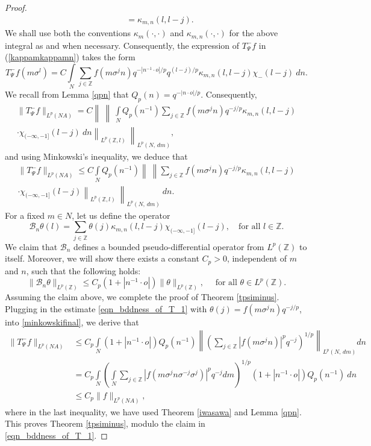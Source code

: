 \documentclass[12pt,reqno]{amsart}
\newcommand{\Z}{\mathbb Z}%
\theoremstyle{definition}
\theoremstyle{definition}
\numberwithin{equation}{section}
\begin{document}
\begin{proof}
\begin{equation}
\begin{aligned}
&=\kappa_{m,n}(l,l-j).
\end{aligned}
\end{equation}
We shall use both the conventions $\kappa_{m}(\cdot,\cdot)$ and $\kappa_{m,n}(\cdot,\cdot)$ for the above integral as and when necessary. Consequently, the expression of $T_{\Psi}^{-}f$ in (\ref{kappamkappamn}) takes the form
	$$T_{\Psi}^{-}f(m\sigma^{l})=C\int\limits_{N}\sum\limits_{j\in\mathbb{Z}}f(m\sigma^{j}n)q^{-|n^{-1}\cdot o|/p}q^{(l-j)/p}\kappa_{m,n}(l,l-j)\chi_{-}(l-j)~dn.$$
We recall from Lemma \ref{qpn} that $Q_{p}(n)=q^{-|n\cdot o|/p}$. Consequently,
	\begin{multline*}
		\|T_{\Psi}^{-}f\|_{L^{p}(NA)}=C\left\|~\left\|~\int\limits_{N}Q_{p}(n^{-1})\sum\limits_{j\in\mathbb{Z}}f(m\sigma^{j}n)q^{-j/p}\kappa_{m,n}(l,l-j)\right.\right.\\
		\left.\left.\cdot\chi_{(-\infty,-1]}(l-j)~dn\right\|_{L^{p}(\mathbb{Z},l)}~\right\|_{L^{p}(N,\,dm)},
	\end{multline*}
and using Minkowski's inequality, we deduce that
	\begin{multline}\label{minkowskifinal}
		\|T_{\Psi}^{-}f\|_{L^{p}(NA)}\leq C\int\limits_{N}Q_{p}(n^{-1})\left\|~\left\|\sum\limits_{j\in\mathbb{Z}}f(m\sigma^{j}n)q^{-j/p}\kappa_{m,n}(l,l-j)\right.\right.\\
		\left.\left.\cdot\chi_{(-\infty,-1]}(l-j)\right\|_{L^{p}(\mathbb{Z},l)}~\right\|_{L^{p}(N,\,dm)}~dn.
	\end{multline}
For a fixed $m\in N$, let us define the operator
$$\mathcal{B}_n\theta(l)=\sum\limits_{j\in\mathbb{Z}}\theta(j)\kappa_{m,n}(l,l-j)\chi_{(-\infty,-1]}(l-j),\quad\text{for all }l\in\mathbb{Z}.$$
We claim that $ \mathcal{B}_n $ defines a bounded pseudo-differential operator from $L^{p}(\mathbb{Z})$ to itself. Moreover, we will show there exists a constant $ C_{p}>0 $, independent of $m$ and $n$, such that the following holds:
	\begin{equation}\label{eqn_bddness_of_T_1}
		\|\mathcal{B}_n \theta\|_{L^p(\Z)} \leq C_{p} (1+|n^{-1}\cdot o|)\|\theta\|_{L^p(\Z)}, \quad \text{ for all } \theta \in L^p(\Z).
	\end{equation}
Assuming the claim above, we complete the proof of Theorem \ref{tpsiminus}. Plugging in the estimate \eqref{eqn_bddness_of_T_1} with $\theta(j)=f(m\sigma^{j}n)q^{-j/p}$, into \eqref{minkowskifinal}, we derive that
\begin{align*} 
\|T_{\Psi}^{-}f\|_{L^{p}(NA)}&\leq C_{p}\int\limits_{N} (1+|n^{-1}\cdot o|)Q_{p}(n^{-1})\left\| \left( \sum\limits_{j\in\mathbb{Z}}|f(m\sigma^{j}n)|^pq^{-j} \right)^{1/p} \right\|_{L^{p}(N,\,dm)}dn\\
& = C_{p} \int\limits_N   \left(  \int\limits_N \sum\limits_{j\in\mathbb{Z}}|f(m\sigma^{j}n\sigma^{-j}\sigma^{j})|^pq^{-j} dm \right)^{1/p} (1+|n^{-1}\cdot o|)Q_{p}(n^{-1})~dn\\
&\leq C _{p}\|f\|_{L^p(NA)},
\end{align*}
where in the last inequality, we have used Theorem \ref{iwasawa} and Lemma \ref{qpn}. This proves Theorem \ref{tpsiminus}, modulo the claim in \eqref{eqn_bddness_of_T_1}.
	

\end{proof}
\end{document}
